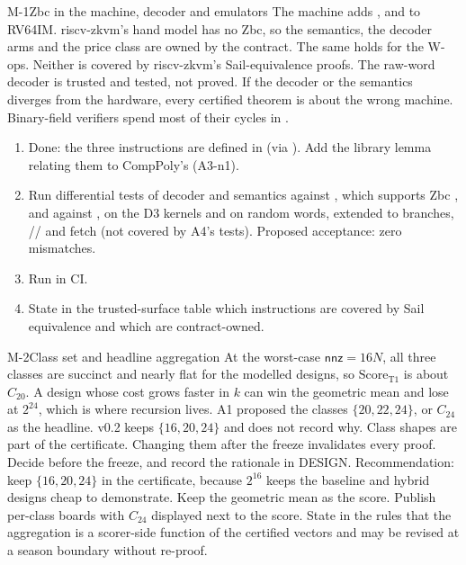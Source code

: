 \begin{issue}{M-1}{Zbc in the machine, decoder and emulators}
\IRprob The machine adds ,  and  to RV64IM. riscv-zkvm's
hand model has no Zbc, so the semantics, the decoder arms and the price class are owned by the
contract. The same holds for the W-ops. Neither is covered by riscv-zkvm's Sail-equivalence proofs.
The raw-word decoder is trusted and tested, not proved.
\IRwhy If the decoder or the semantics diverges from the hardware, every certified theorem is about
the wrong machine. Binary-field verifiers spend most of their cycles in .
\IRres
\begin{enumerate}[nosep,leftmargin=1.4em]
\item Done: the three instructions are defined in  (via ). Add the
  library lemma relating them to CompPoly's  (A3-n1).
\item Run differential tests of decoder and semantics against , which supports
  Zbc \cite{RISCV-Bitmanip}, and against , on the D3 kernels and on random words,
  extended to branches, // and fetch (not covered by A4's tests).
  Proposed acceptance: zero mismatches.
\item Run  in CI.
\item State in the trusted-surface table which instructions are covered by Sail equivalence and
  which are contract-owned.
\end{enumerate}
\end{issue}

\begin{issue}{M-2}{Class set and headline aggregation}
\IRprob At the worst-case $\mathsf{nnz}=16N$, all three classes are succinct and nearly flat for
the modelled designs, so $\mathrm{Score}_{\mathrm{T1}}$ is about $C_{20}$. A design whose cost grows
faster in $k$ can win the geometric mean and lose at $2^{24}$, which is where recursion lives. A1
proposed the classes $\{20,22,24\}$, or $C_{24}$ as the headline. v0.2 keeps $\{16,20,24\}$ and
does not record why.
\IRwhy Class shapes are part of the certificate. Changing them after the freeze invalidates every
proof.
\IRres Decide before the freeze, and record the rationale in DESIGN. Recommendation: keep
$\{16,20,24\}$ in the certificate, because $2^{16}$ keeps the baseline and hybrid designs cheap to
demonstrate. Keep the geometric mean as the score. Publish per-class boards with $C_{24}$ displayed
next to the score. State in the rules that the aggregation is a scorer-side function of the
certified vectors and may be revised at a season boundary without re-proof.
\end{issue}

